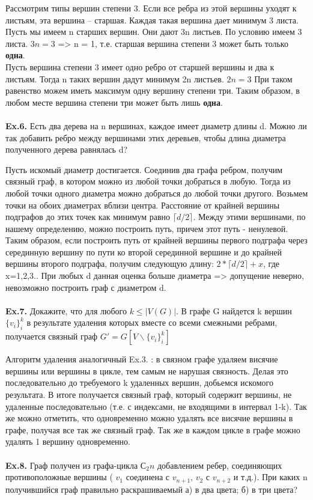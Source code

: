 \documentclass[a4paper,12pt]{article}
\begin{document}
Рассмотрим типы вершин степени 3. Если все ребра из этой вершины уходят к листьям, эта вершина -- старшая. Каждая такая вершина дает минимум 3 листа. Пусть мы имеем n старших вершин. Они дают 3n листьев. По условию имеем 3 листа. $ 3n = 3 $ => n = 1, т.е. старшая вершина степени 3 может быть только \textbf{одна}.
\\
Пусть вершина степени 3 имеет одно ребро от старшей вершины и два к листьям. Тогда n таких вершин дадут минимум 2n листьев. $ 2n = 3 $ При таком равенство можем иметь максимум одну вершину степени три. Таким образом, в любом месте вершина степени три может быть лишь \textbf{одна}.
\\
\\
\textbf{Ex.6.} Есть два дерева на n вершинах, каждое имеет диаметр длины d. Можно ли так добавить ребро между вершинами этих деревьев, чтобы длина диаметра полученного дерева равнялась d?

Пусть искомый диаметр достигается. Соединив два графа ребром, получим связный граф, в котором можно из любой точки добраться в любую. Тогда из любой точки одного диаметра можно добраться до любой точки другого. Возьмем точки на обоих диаметрах вблизи центра. Расстояние от крайней вершины подграфов до этих точек как минимум равно $ \lceil d/2 \rceil $. Между этими вершинами, по нашему определению, можно построить путь, причем этот путь - ненулевой. Таким образом, если построить путь от крайней вершины первого подграфа через серединную вершину по пути ко второй серединной вершине и до крайней вершины второго подграфа, получим следующую длину: $ 2 * \lceil d/2 \rceil + x $, где x=1,2,3.. При любых d данная оценка больше диаметра => допущение неверно, невозможно построить граф с диаметром d.
\\
\\
\textbf{Ex.7.} Докажите, что для любого $ k \leq |V(G)| $. В графе G найдется k вершин $ \lbrace v_i \rbrace ^k_i $ в результате удаления которых вместе со всеми смежными ребрами, получается связный граф $ G' = G[V \backslash \lbrace v_i \rbrace ^k_i ]$ 

Алгоритм удаления аналогичный Ex.3. : в связном графе удаляем висячие вершины или вершины в цикле, тем самым не нарушая связность. Делая это последовательно до требуемого k удаленных вершин, добьемся искомого результата. В итоге получается связный граф, который содержит вершины, не удаленные последовательно (т.е. с индексами, не входящими в интервал 1-k). Так же можно отметить, что одновременно можно удалять все висячие вершины в графе, получая все так же связный граф. Так же в каждом цикле в графе можно удалять 1 вершину одновременно.
\\
\\
\textbf{Ex.8.} Граф получен из графа-цикла $ С_2n $ добавлением ребер, соединяющих противоположные вершины ( $ v_1 $ соединена с $ v_{n+1} $, $ v_2 $ с $ v_{n+2} $ и т.д.). При каких n получившийся граф правильно раскрашиваемый а) в два цвета; б) в три цвета?
\end{document}
